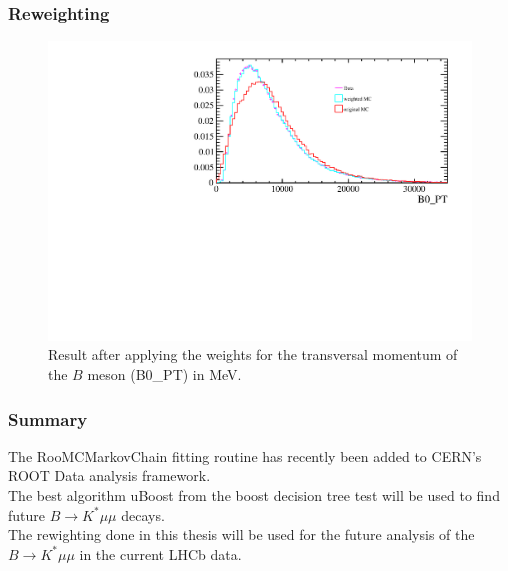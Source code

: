 \documentclass{beamer}
\begin{document}
\begin{frame}
  \frametitle{Reweighting}

  \begin{figure}
   \includegraphics[width=0.8\linewidth]{figures/B0_PT}
   \caption{Result after applying the weights for the transversal momentum of the $B$ meson (B0\_PT) in MeV.}
  \end{figure}


\end{frame}





\begin{frame}
 \frametitle{Summary}

The RooMCMarkovChain fitting routine has recently been added to CERN's ROOT Data analysis framework. \\
 The best algorithm uBoost from the boost decision tree test will be used to find future $B \rightarrow K^* \mu \mu$ decays. \\
 The rewighting done in this thesis will be used for the future analysis of the $B \rightarrow K^* \mu \mu$ in the current LHCb data.

\end{frame}
\end{document}
